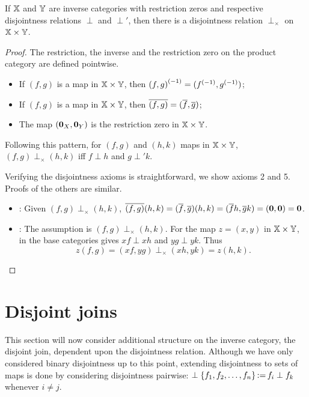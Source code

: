 \begin{lemma}\label{lem:disjointness_is_derivable_on_a_product_category}
  If $\mathbb{X}$ and $\mathbb{Y}$ are inverse categories with restriction zeros and respective disjointness
  relations $\perp$ and $\perp'$, then there is a disjointness relation
  $\perp_{\times}$ on $\mathbb{X}\times\mathbb{Y}$.
\end{lemma}
\begin{proof}
  The restriction, the inverse and the restriction zero on the product category are defined pointwise.
  \begin{itemize}
    \item If $(f,g)$ is a map in $\mathbb{X}\times\mathbb{Y}$, then ${(f,g)}^{(-1)} = ({f}^{(-1)}, {g}^{(-1)})$;
    \item If $(f,g)$ is a map in $\mathbb{X}\times\mathbb{Y}$, then $\overline{(f,g)} = (\overline{f}, \overline{g})$;
    \item The map $(\mathbf{0}_X,\mathbf{0}_Y)$ is the restriction zero in $\mathbb{X}\times\mathbb{Y}$.
  \end{itemize}

  Following this pattern, for $(f,g)$ and $(h,k)$ maps in $\mathbb{X}\times\mathbb{Y}$, $(f,g) \perp_{\times}(h,k)$
  iff $f\perp h$ and $g\perp' k$.

  Verifying the disjointness axioms is straightforward, we show axioms 2 and 5. Proofs of the
  others are similar.
  {
  \begin{itemize}
    \item [\axiom{Dis}{2}]: Given $(f,g)\perp_{\times}(h,k)$,
      $\overline{(f,g)}(h,k) =  (\overline{f},\overline{g})(h,k) = (\overline{f} h, \overline{g} k) = (\mathbf{0}, \mathbf{0}) = \mathbf{0}$.
    \item [\axiom{Dis}{5}]: The assumption is $(f,g)\perp_{\times}(h,k)$. For the map $z = (x,y)$
      in $\mathbb{X} \times \mathbb{Y}$,  in the base categories gives $x f \perp x h$ and $y g \perp
      y k$. Thus
      \[
        z(f,g) = (x f, y g) \perp_{\times} (x h, y k) = z(h,k).
      \]
  \end{itemize}
  }
\end{proof}

\section{Disjoint joins} %
\label{sec:disjoint_joins}

This section will now consider additional structure on the inverse category, the disjoint join,
dependent upon the disjointness relation. Although we have only considered  binary disjointness
up to this point, extending disjointness to sets of maps is done by considering disjointness
pairwise: $\perp \{f_1,f_2,\ldots,f_n\} \operatorname*{:\!=} f_i \perp f_k$ whenever $i \ne j$.


